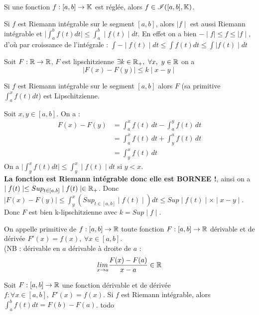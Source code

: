 \bigskip

\bp
Si une fonction $f : [a,b] \to \mathbb{K}$ est réglée, alors $f \in \mathscr{I}([a,b], \mathbb{K})$.
\ep

\bigskip


\bp
Si $f$ est Riemann intégrable sur le segment $[a,b]$, alors $\mid f \mid$ est aussi Riemann intégrable et $\mid \int_a^b f(t) dt \mid \leq \int_a^b \mid f(t) \mid dt$. En effet on a bien $-\mid f\mid \leq f \leq \mid f \mid$, d'où par croissance de l'intégrale : $\int - \mid f(t) \mid dt \leq \int f(t) dt \leq \int \mid f(t) \mid dt$
\ep

\bigskip

\bd[Lipshitzienne]
Soit $F : \mathbb{R} \to \mathbb{R}$, $F$ est lipschitzienne \ssi $\exists k \in \mathbb{R}_+, ~ \forall x,~y \in \mathbb{R}$ on a $$ \mid F(x) - F(y) \mid \leq k \mid x- y \mid$$
\ed

\bigskip

\bp
Si $f$ est Riemann intégrable sur le segment $[a,b]$ alors $F$ (sa primitive $\int_a^x f(t)dt$) est Lipschitzienne.
\ep

\bpf
Soit $x,y \in [a,b]$.
On a : 
\begin{align*}
F(x) - F(y) &= \int_a^x f(t) \, dt - \int_a^y f(t) \, dt \\
&= \int_a^x f(t) \, dt + \int_y^a f(t) \, dt \\
&= \int_y^x f(t) \, dt 
\end{align*}
On a $\mid \int_y^x f(t) dt \mid \leq \int_y^x \mid f(t) \mid dt$ si $y<x$.\\
\textbf{La fonction est Riemann intégrable donc elle est BORNEE !}, ainsi on a $\mid f(t) \mid \leq Sup_{t\in [a,b]} \mid f(t) \mid \in \mathbb{R}_+$. Donc $\mid F(x) - F(y) \mid \leq \int_y^x (Sup_{t \in [a,b]} \mid f(t)\mid) dt \leq Sup \mid f(t) \mid \times \mid x - y \mid$. Donc $F$ est bien k-lipschitzienne avec $k = Sup \mid f \mid$.
\epf

\bigskip

\bd
On appelle primitive de $f : [a,b] \to \mathbb{R}$ toute fonction $F : [a,b] \to \mathbb{R}$ dérivable et de dérivée $F'(x) = f(x), ~ \forall x \in [a,b]$.\\
(NB : dérivable en $a$ \ie dérivable à droite de $a$ : $$\underset{x \to a}{lim} \frac{F(x) - F(a)}{x-a} \in \mathbb{R}$$
\ed

\bigskip

Soit $F : [a,b] \to \mathbb{R}$ une fonction dérivable et de dérivée $f : \forall x \in [a,b], ~ F'(x) = f(x)$. Si $f$ est Riemann intégrable, alors $\int_a^b f(t)dt = F(b)-F(a)$.
\ep
\bpf
todo
\epf


